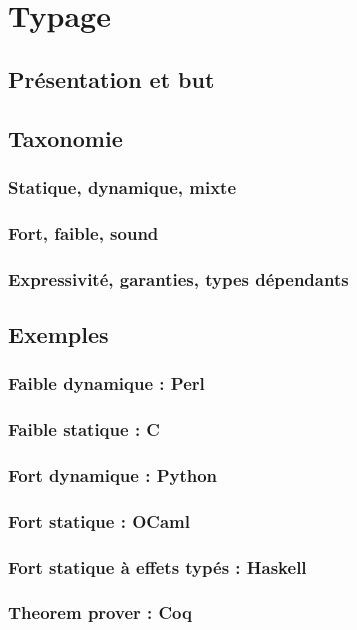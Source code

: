 \documentclass{phdthesis}
\begin{document}
\chapter{Typage}

\section{Présentation et but}
\section{Taxonomie}

\subsection{Statique, dynamique, mixte}
\subsection{Fort, faible, sound}
\subsection{Expressivité, garanties, types dépendants}

\section{Exemples}

\subsection{Faible dynamique : Perl}
\subsection{Faible statique : C}
\subsection{Fort dynamique : Python}
\subsection{Fort statique : OCaml}
\subsection{Fort statique à effets typés : Haskell}
\subsection{Theorem prover : Coq}
\end{document}

